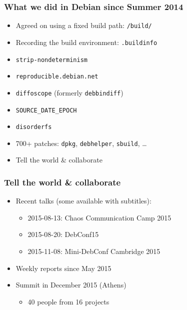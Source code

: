 \documentclass[14pt]{beamer}
\begin{document}
\begin{frame}
 \frametitle{What we did in Debian since Summer 2014}

 \begin{itemize}
  \item Agreed on using a fixed build path: \texttt{/build/}
  \item Recording the build environment: \texttt{.buildinfo}
  \item \texttt{strip-nondeterminism}
  \item \texttt{reproducible.debian.net}
  \item \texttt{diffoscope} (formerly \texttt{debbindiff})
  \item \texttt{SOURCE\_DATE\_EPOCH}
  \item \texttt{disorderfs}
  \item 700+ patches: \texttt{dpkg}, \texttt{debhelper}, \texttt{sbuild}, …
  \item<2> Tell the world \& collaborate
 \end{itemize}
\end{frame}


\begin{frame}
 \frametitle{Tell the world \& collaborate}

 \begin{itemize}
  \item Recent talks (some available with subtitles):
   \begin{itemize}
    \item 2015-08-13: Chaos Communication Camp 2015
    \item 2015-08-20: DebConf15
    \item 2015-11-08: Mini-DebConf Cambridge 2015
   \end{itemize}
  \item Weekly reports since May 2015
  \item Summit in December 2015 (Athens)
   \begin{itemize}
    \item 40 people from 16 projects
   \end{itemize}
 \end{itemize}
\end{frame}
\end{document}
